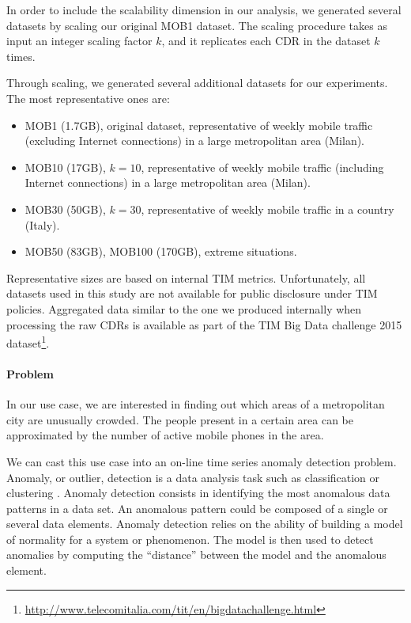 {In order to include the scalability dimension in our analysis, we generated several datasets by scaling our original MOB1 dataset. The scaling procedure takes as input an integer scaling factor $k$, and it replicates each CDR in the dataset $k$ times.

Through scaling, we generated several additional datasets for our experiments. The most representative ones are:
\begin{itemize}
\item MOB1 (1.7GB), original dataset, representative of weekly mobile traffic (excluding Internet connections) in a large metropolitan area (Milan).
\item MOB10 (17GB), $k = 10$, representative of weekly mobile traffic (including Internet connections) in a large metropolitan area (Milan).
\item MOB30 (50GB), $k = 30$, representative of weekly mobile traffic in a country (Italy).
\item MOB50 (83GB), MOB100 (170GB), extreme situations.
\end{itemize}
Representative sizes are based on internal TIM metrics. Unfortunately, all datasets used in this study are not available for public disclosure under TIM policies. Aggregated data similar to the one we produced internally when processing the raw CDRs is available as part of the TIM Big Data challenge 2015 dataset\footnote{\url{http://www.telecomitalia.com/tit/en/bigdatachallenge.html}}.

\paragraph{Problem}
\label{sec:model}
In our use case, we are interested in finding out which areas of a metropolitan city are unusually crowded. The people present in a certain area can be approximated by the number of active mobile phones in the area.

We can cast this use case into an on-line time series anomaly detection problem. Anomaly, or outlier, detection is a data analysis task such as classification or clustering \cite{aggarwal2015outlier}. Anomaly detection consists in identifying the most anomalous data patterns in a data set. An anomalous pattern could be composed of a single or several data elements. Anomaly detection relies on the ability of building a model of normality for a system or phenomenon. The model is then used to detect anomalies by computing the ``distance'' between the model and the anomalous element.

}
